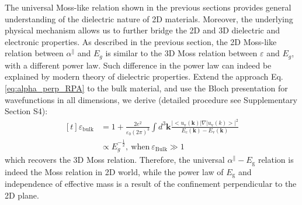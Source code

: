 \documentclass[journal=ancac3,manuscript=article,email=true,hyperref=true,keywords=false]{achemso}
\begin{document}
The universal Moss-like relation shown in the previous sections
provides general understanding of the dielectric nature of 2D
materials. Moreover, the underlying physical mechanism allows us to
further bridge the 2D and 3D dielectric and electronic properties. As
described in the previous section, the 2D Moss-like relation between
$\alpha^{\parallel}$ and $E_{g}$ is similar to the 3D Moss relation
between $\varepsilon$ and $E_{g}$, with a different power law. Such
difference in the power law can indeed be explained by modern theory
of dielectric properties.  Extend the approach
Eq. \ref{eq:alpha_perp_RPA} to the bulk material, and use the Bloch
presentation for wavefunctions in all dimensions, we derive (detailed
procedure see Supplementary Section S4):
\begin{equation}
  \label{eq:alpha-Eg-3D}
  \begin{aligned}[t]
  \varepsilon_{\mathrm{bulk}} &= 1 + \frac{2e^{2}}{\varepsilon_{0}(2\pi)^{3}}\int d^{3}\mathbf{k}
  \frac{|<u_{\mathrm{v}}(\mathbf{k})|\nabla|u_{\mathrm{v}}(k)>|^{2}}
  {E_{\mathrm{c}}(\mathbf{k}) - E_{\mathrm{v}}(\mathbf{k})} \\
  &\propto E_{g}^{-\frac{1}{2}},\ \mathrm{when}\ \varepsilon_{\mathrm{Bulk}} \gg 1
\end{aligned}
\end{equation}
which recovers the 3D Moss relation. Therefore, the universal
$\alpha^{\parallel}-E_{\mathrm{g}}$ relation is indeed the Moss
relation in 2D world, while the power law of $E_{\mathrm{g}}$ and
independence of effective mass is a result of the confinement
perpendicular to the 2D plane. 
\end{document}
